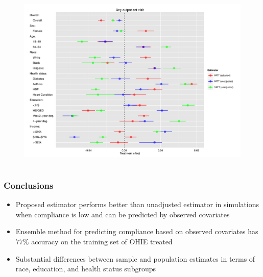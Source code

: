 \documentclass{beamer}
\begin{document}
\begin{frame}
\begin{figure}[htbp]
\begin{center}
   \includegraphics[scale=0.4]{../paper/any-out-plot-horz.pdf} 
   \label{het-plot-ao}
   \end{center}
\end{figure}
\end{frame}



\section[Conclusions]{}

\begin{frame}
\frametitle{Conclusions}
\begin{itemize}
\item Proposed estimator performs better than unadjusted estimator in simulations when compliance is low and can be predicted by observed covariates
\item Ensemble method for predicting compliance based on observed covariates has $77\%$ accuracy on the training set of OHIE treated
\item Substantial differences between sample and population estimates in terms of race, education, and health status subgroups
\end{itemize}
\end{frame}

\section[References]{}
\end{document}
